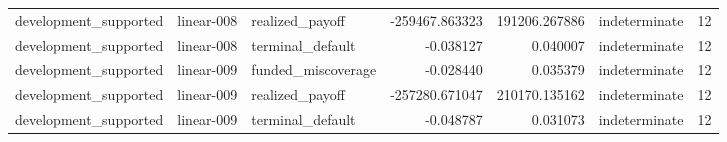 \begin{tabular}{lllrrlr}
development\_supported & linear-008 & realized\_payoff & -259467.863323 & 191206.267886 & indeterminate & 12 \\
development\_supported & linear-008 & terminal\_default & -0.038127 & 0.040007 & indeterminate & 12 \\
development\_supported & linear-009 & funded\_miscoverage & -0.028440 & 0.035379 & indeterminate & 12 \\
development\_supported & linear-009 & realized\_payoff & -257280.671047 & 210170.135162 & indeterminate & 12 \\
development\_supported & linear-009 & terminal\_default & -0.048787 & 0.031073 & indeterminate & 12 \\
\bottomrule
\end{tabular}
